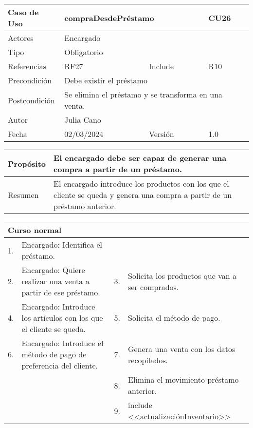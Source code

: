 \begin{table}[H]
	\centering
	\begin{tabular}{| m{} | m{} | m{} | m{}|}
		\hline
		\rowcolor{grayshade} Caso de Uso & \multicolumn{2}{|m{0.43\textwidth}|}{compraDesdePréstamo} &  CU26\\ 
		\hline
		Actores & \multicolumn{3}{l|}{Encargado} \\ 
		\hline
		Tipo & \multicolumn{3}{l|}{Obligatorio} \\ 
		\hline
		Referencias & RF27 & Include & R10 \\ 
		\hline
		Precondición & \multicolumn{3}{m{0.67\textwidth}|}{Debe existir el préstamo} \\ 
		\hline
		Postcondición & \multicolumn{3}{m{0.67\textwidth}|}{Se elimina el préstamo y se transforma en una venta.} \\ 
		\hline
		Autor & \multicolumn{3}{l|}{Julia Cano} \\ 
		\hline
		Fecha & 02/03/2024 & Versión & 1.0 \\
		\hline
	\end{tabular}
\end{table}

\begin{table}[H]
	\centering
	\begin{tabular}{| m{} | m{} | m{} | m{} |}
		\hline
		Propósito & \multicolumn{3}{m{0.67\textwidth}|}{El encargado debe ser capaz de generar una compra a partir de un préstamo.}  \\ 
		\hline
		Resumen & \multicolumn{3}{m{0.67\textwidth}|}{El encargado introduce los productos con los que el cliente se queda y genera una compra a partir de un préstamo anterior.} \\ 
		\hline
	\end{tabular}
\end{table}


\begin{table}[H]
	\centering
	\begin{tabular}{| m{} | m{} | m{} | m{} |}
		\hline
		\multicolumn{4}{|m{0.9\textwidth}|}{Curso normal}     \\ 
		\hline
		1. & Encargado: Identifica el préstamo. &  &   \\ 
		\hline
		2. & Encargado: Quiere realizar una venta a partir de ese préstamo. & 3. &  Solicita los productos que van a ser comprados.  \\ 
		\hline
		4. & Encargado: Introduce los artículos con los que el cliente se queda. & 5. &  Solicita el método de pago.  \\ 
		\hline
		6. & Encargado: Introduce el método de pago de preferencia del cliente. & 7. &  Genera una venta con los datos recopilados.  \\ 
		\hline
		&  & 8. &  Elimina el movimiento préstamo anterior.  \\ 
		\hline
		&  & 9. &  include <<actualizaciónInventario>>  \\ 
		\hline
	\end{tabular}
\end{table}

